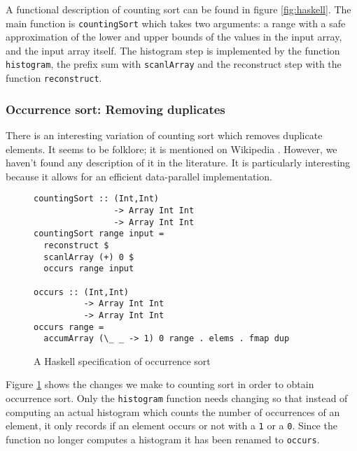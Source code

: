 A functional description of counting sort can be found in figure
\ref{fig:haskell}. The main function is \verb!countingSort! which
takes two arguments: a range with a safe approximation of the lower
and upper bounds of the values in the input array, and the input array
itself. The histogram step is implemented by the function
\verb!histogram!, the prefix sum with \verb!scanlArray! and the
reconstruct step with the function \verb!reconstruct!.

\subsubsection{Occurrence sort: Removing duplicates}

There is an interesting variation of counting sort which removes
duplicate elements. It seems to be folklore; it is mentioned on
Wikipedia . However, we haven't found any description
of it in the literature. It is particularly interesting because it
allows for an efficient data-parallel implementation.


\begin{figure}
\begin{small}
\begin{verbatim}
countingSort :: (Int,Int) 
                -> Array Int Int 
                -> Array Int Int
countingSort range input =
  reconstruct $
  scanlArray (+) 0 $
  occurs range input

occurs :: (Int,Int) 
          -> Array Int Int 
          -> Array Int Int
occurs range = 
  accumArray (\_ _ -> 1) 0 range . elems . fmap dup
\end{verbatim}
\end{small}
\caption{A Haskell specification of occurrence sort}
\label{fig:duphaskell}
\end{figure}

Figure \ref{fig:duphaskell} shows the changes we make 
to counting sort in order to obtain occurrence sort.
Only the \verb!histogram! function needs changing
so that instead of computing an actual histogram which counts the
number of occurrences of an element, it only records if an element
occurs or not with a \verb!1! or a \verb!0!. Since the function
no longer computes a histogram it has been renamed to
\verb!occurs!.

